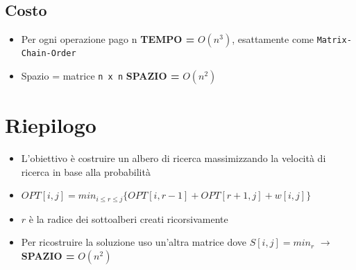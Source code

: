 \subsection{Costo}

\begin{itemize}
  \item
        Per ogni operazione pago n \textbf{TEMPO =} $O(n^3)$, esattamente
        come \texttt{Matrix-Chain-Order}
  \item
        Spazio = matrice \texttt{n\ x\ n} \textbf{SPAZIO =} $O(n^2)$
\end{itemize}

\section{Riepilogo}

\begin{itemize}
  \item
        L'obiettivo è costruire un albero di ricerca massimizzando la velocità
        di ricerca in base alla probabilità
  \item
        $OPT[i,j] = min_{i \le r \le j} \{ OPT[i, r-1] + OPT[r+1, j] + w[i,j] \}$
  \item
        $r$ è la radice dei sottoalberi creati ricorsivamente
  \item
        Per ricostruire la soluzione uso un'altra matrice dove
        $S[i,j] = min_r$ $\rightarrow$ \textbf{SPAZIO =} $O(n^2)$
\end{itemize}
